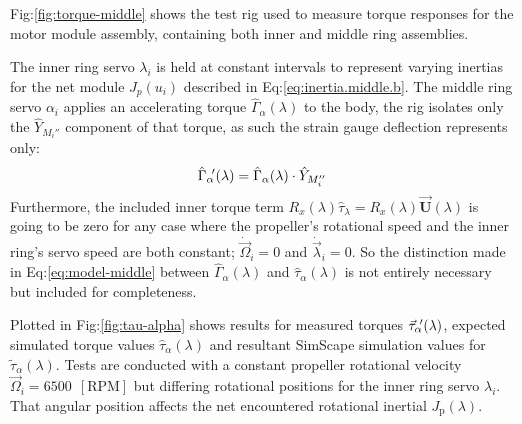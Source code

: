 \par
Fig:\ref{fig:torque-middle} shows the test rig used to measure torque responses for the motor module assembly, containing both inner and middle ring assemblies. 
\par
The inner ring servo $\lambda_i$ is held at constant intervals to represent varying inertias for the net module $J_p(u_i)$ described in Eq:\ref{eq:inertia.middle.b}. The middle ring servo $\alpha_i$ applies an accelerating torque $\hat{\Gamma}_\alpha(\lambda)$ to the body, the rig isolates only the $\hat{Y}_{M_i''}$ component of that torque, as such the strain gauge deflection represents only:
\begin{equation}
\hat{\Gamma}_\alpha\text{}\hspace{-2pt}'(\lambda)=\hat{\Gamma}_\alpha(\lambda)\cdot\hat{Y}_{M_i''}
\end{equation}
Furthermore, the included inner torque term $R_x(\lambda)\hat{\tau}_\lambda=R_x(\lambda)\vec{\mathbf{U}}(\lambda)$ is going to be zero for any case where the propeller's rotational speed and the inner ring's servo speed are both constant; $\dot{\vec{\Omega}}_i=0$ and $\dot{\vec{\lambda}}_i=0$. So the distinction made in Eq:\ref{eq:model-middle} between $\hat{\Gamma}_\alpha(\lambda)$ and $\hat{\tau}_\alpha(\lambda)$ is not entirely necessary but included for completeness.
\par
Plotted in Fig:\ref{fig:tau-alpha} shows results for measured torques $\vec{\tau}_\alpha\text{}\hspace{-2pt}'(\lambda)$, expected simulated torque values $\hat{\tau}_\alpha(\lambda)$ and resultant SimScape simulation values for $\tilde{\tau}_\alpha(\lambda)$. Tests are conducted with a constant propeller rotational velocity $\vec{\Omega}_i=6500~~[\text{RPM}]$ but differing rotational positions for the inner ring servo $\lambda_i$. That angular position affects the net encountered rotational inertial $J_\text{p}(\lambda)$.
